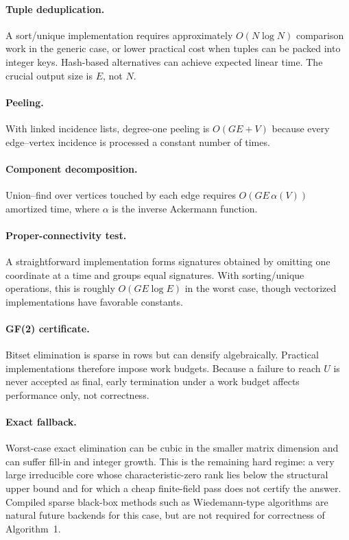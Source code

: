 \documentclass[11pt]{article}
\theoremstyle{definition}
\newcommand{\1}{\mathbf{1}}
\begin{document}
\paragraph{Tuple deduplication.}
A sort/unique implementation requires approximately $O(N\log N)$ comparison work in the generic case, or lower practical cost when tuples can be packed into integer keys. Hash-based alternatives can achieve expected linear time. The crucial output size is $E$, not $N$.

\paragraph{Peeling.}
With linked incidence lists, degree-one peeling is $O(GE+V)$ because every edge--vertex incidence is processed a constant number of times.

\paragraph{Component decomposition.}
Union--find over vertices touched by each edge requires $O(GE\,\alpha(V))$ amortized time, where $\alpha$ is the inverse Ackermann function.

\paragraph{Proper-connectivity test.}
A straightforward implementation forms signatures obtained by omitting one coordinate at a time and groups equal signatures. With sorting/unique operations, this is roughly $O(GE\log E)$ in the worst case, though vectorized implementations have favorable constants.

\paragraph{GF(2) certificate.}
Bitset elimination is sparse in rows but can densify algebraically. Practical implementations therefore impose work budgets. Because a failure to reach $U$ is never accepted as final, early termination under a work budget affects performance only, not correctness.

\paragraph{Exact fallback.}
Worst-case exact elimination can be cubic in the smaller matrix dimension and can suffer fill-in and integer growth. This is the remaining hard regime: a very large irreducible core whose characteristic-zero rank lies below the structural upper bound and for which a cheap finite-field pass does not certify the answer. Compiled sparse black-box methods such as Wiedemann-type algorithms are natural future backends for this case, but are not required for correctness of Algorithm~1.
\end{document}
